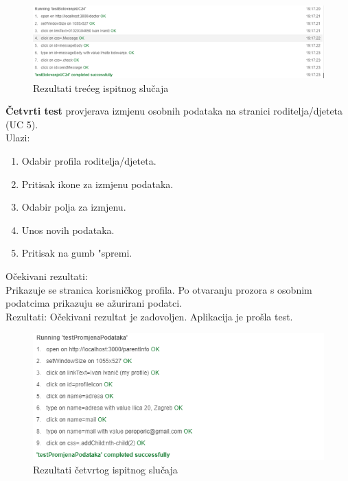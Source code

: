 		\begin{figure}[H]
			\includegraphics[width=\textwidth]{slike/propisivanjeBolovanja.PNG} %
			\caption{Rezultati trećeg ispitnog slučaja}
			\label{fig:propisivanjeBolovanjaTest} %
		\end{figure}
		\eject 
		
		\noindent \textbf{Četvrti test} provjerava izmjenu osobnih podataka na stranici roditelja/djeteta (UC 5).\\
		Ulazi:
		\begin{enumerate}
			\item Odabir profila roditelja/djeteta.
			\item Pritisak ikone za izmjenu podataka.
			\item Odabir polja za izmjenu.
			\item Unos novih podataka.
			\item Pritisak na gumb "spremi.
		\end{enumerate}
		Očekivani rezultati:\\ Prikazuje se stranica korisničkog profila. Po otvaranju prozora s osobnim podatcima prikazuju se ažurirani podatci.\\
		Rezultati: Očekivani rezultat je zadovoljen. Aplikacija je prošla test.
		
		\begin{figure}[H]
			\includegraphics[width=\textwidth]{slike/promjenaPodataka.PNG} %
			\caption{Rezultati četvrtog ispitnog slučaja}
			\label{fig:promjenaPodatakaTest} %
		\end{figure}
		\eject
		
